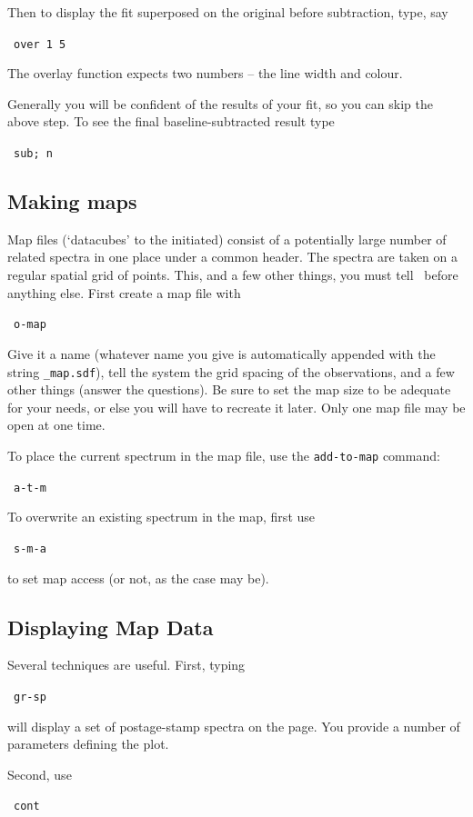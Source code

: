 Then to display the fit superposed on the original before subtraction,
type, say

\SP\ {\tt{over 1 5}}

The overlay function expects two numbers -- the line width and colour.

Generally you will be confident of the results of your fit, so you can
skip the above step. To see the final baseline-subtracted result type

\SP\ {\tt{sub; n}}

\subsection{Making maps}
Map files (`datacubes' to the initiated)
consist of a potentially large number of related spectra in one place
under a common header. The spectra are taken on a regular spatial grid
of points. This, and a few other things, you must tell \SPECX\ before
anything else. First create a map file with

\SP\ {\tt{o-map}}

Give it a name (whatever name you give is automatically appended with
the string {\tt{\_map.sdf}}), tell the system the grid spacing of the
observations, and a few other things (answer the questions). Be sure
to set the map size to be adequate for your needs, or else you will
have to recreate it later. Only one map file may be open at one time.

To place the current spectrum in the map file, use the {\tt{add-to-map}} 
command:

\SP\ {\tt{a-t-m}}

\normalmarginpar
To overwrite an existing spectrum in the map, first use 

\SP\ {\tt{s-m-a}} 

to set map access (or not, as the case may be).

\subsection{Displaying Map Data}
Several techniques are useful. First, typing

\SP\ {\tt gr-sp}

will display a set of postage-stamp spectra on the page. You provide a
number of parameters defining the plot.

Second, use

\SP\ {\tt cont}

